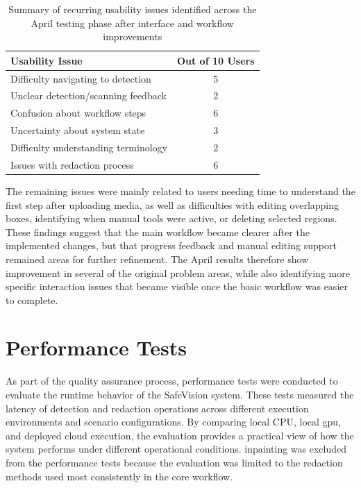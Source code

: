 \begin{table}[H]
\centering
\begin{tabular}{lc}
\hline
\textbf{Usability Issue} & \textbf{Out of 10 Users} \\
\hline
Difficulty navigating to detection & 5 \\
Unclear detection/scanning feedback & 2  \\
Confusion about workflow steps & 6 \\
Uncertainty about system state & 3  \\
Difficulty understanding terminology & 2 \\
Issues with redaction process & 6 \\
\hline
\end{tabular}
\caption{Summary of recurring usability issues identified across the April testing phase after interface and workflow improvements}
\label{tab:user_test_after}
\end{table}

The remaining issues were mainly related to users needing time to understand the first step after uploading media, as well as difficulties with editing overlapping boxes, identifying when manual tools were active, or deleting selected regions. These findings suggest that the main workflow became clearer after the implemented changes, but that progress feedback and manual editing support remained areas for further refinement. The April results therefore show improvement in several of the original problem areas, while also identifying more specific interaction issues that became visible once the basic workflow was easier to complete.


\section{Performance Tests}
\label{sec:performance_tests}

As part of the quality assurance process, performance tests were conducted to evaluate the runtime behavior of the \gls{SafeVision} system. These tests measured the latency of detection and redaction operations across different execution environments and scenario configurations. By comparing local CPU, local \gls{gpu}, and deployed cloud execution, the evaluation provides a practical view of how the system performs under different operational conditions. \Gls{inpainting} was excluded from the performance tests because the evaluation was limited to the redaction methods used most consistently in the core workflow.



